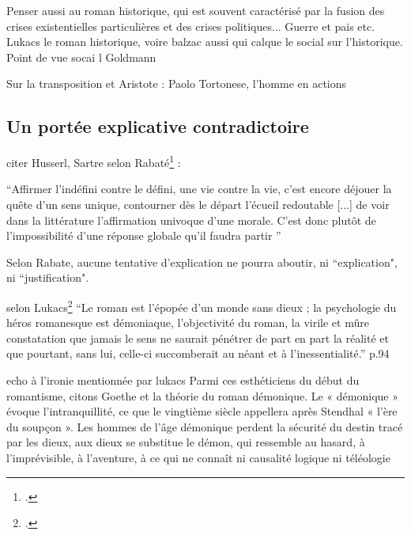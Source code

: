 \documentclass[a4paper,10pt]{article}
\begin{document}
				Penser aussi au roman historique, qui est souvent caractérisé par la fusion des crises existentielles particulières et des crises politiques... Guerre et pais etc. Lukacs le roman historique, voire balzac aussi qui calque le social sur l'historique.
				Point de vue socai l Goldmann
		
		
			Sur la transposition et Aristote : Paolo Tortonese, l'homme en actions
		
		

			  
			
			
			
			
			
			
			

			
			
			
			
			
			
		\subsection{Un portée explicative contradictoire}
			citer Husserl, Sartre
			selon Rabaté\footcite{Rabate2010} :
			\begin{center}
				\footnotesize
				\begin{minipage}{0.7\textwidth}
					``Affirmer l’indéfini contre le défini, une vie contre la vie, c’est encore déjouer la quête d’un sens
					unique, contourner dès le départ l’écueil redoutable [...] de voir dans la littérature l’affirmation univoque d’une morale. C’est donc plutôt de l’impossibilité d’une réponse globale qu’il faudra partir ''
				\end{minipage}
			\end{center}
			Selon Rabate, aucune tentative d'explication ne pourra aboutir, ni ``explication", ni ``justification".
			
			selon Lukacs\footcite{Lukacs1916}
			 ``Le roman est l’épopée d’un monde sans dieux ; la psychologie
			 du héros romanesque est démoniaque, l’objectivité du roman, la virile et mûre
			 constatation que jamais le sens ne saurait pénétrer de part en part la réalité et que
			 pourtant, sans lui, celle-ci succomberait au néant et à l’inessentialité.'' p.94
			
			
			
			
			
			
			echo à l'ironie mentionnée par lukacs
			Parmi ces esthéticiens du début du romantisme, citons Goethe et la théorie du roman
			démonique. Le « démonique » évoque l’intranquillité, ce que le vingtième siècle appellera
			après Stendhal « l’ère du soupçon ». Les hommes de l’âge démonique perdent la sécurité du
			destin tracé par les dieux, aux dieux se substitue le démon, qui ressemble au hasard, à
			l’imprévisible, à l’aventure, à ce qui ne connaît ni causalité logique ni téléologie
\end{document}
